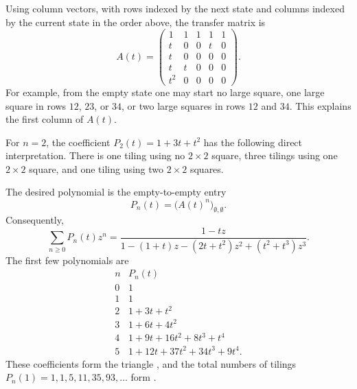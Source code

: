 \begin{figure}
\end{figure}

Using column vectors, with rows indexed by the next state and columns indexed
by the current state in the order above, the transfer matrix is
\[
  A(t)=
  \begin{pmatrix}
  1 & 1 & 1 & 1 & 1 \\
  t & 0 & 0 & t & 0 \\
  t & 0 & 0 & 0 & 0 \\
  t & t & 0 & 0 & 0 \\
  t^2 & 0 & 0 & 0 & 0
  \end{pmatrix}.
\]
For example, from the empty state one may start no large square, one large
square in rows $12$, $23$, or $34$, or two large squares in rows $12$ and
$34$. This explains the first column of $A(t)$.

For \(n=2\), the coefficient \(P_2(t)=1+3t+t^2\) has the following direct
interpretation.  There is one tiling using no \(2\times2\) square, three
tilings using one \(2\times2\) square, and one tiling using two \(2\times2\)
squares.

\begin{figure}
\end{figure}

The desired polynomial is the empty-to-empty entry
\[
  P_n(t)=\bigl(A(t)^n\bigr)_{\emptyset,\emptyset}.
\]
Consequently,
\[
  \sum_{n\geq 0} P_n(t) z^n
  =
  \frac{1-tz}
  {1-(1+t)z-(2t+t^2)z^2+(t^2+t^3)z^3}.
\]
The first few polynomials are
\[
\begin{array}{c|l}
n & P_n(t) \\ \hline
0 & 1\\
1 & 1\\
2 & 1+3t+t^2\\
3 & 1+6t+4t^2\\
4 & 1+9t+16t^2+8t^3+t^4\\
5 & 1+12t+37t^2+34t^3+9t^4 .
\end{array}
\]
These coefficients form the triangle , and the total numbers
of tilings $P_n(1)=1,1,5,11,35,93,\dotsc$ form .


